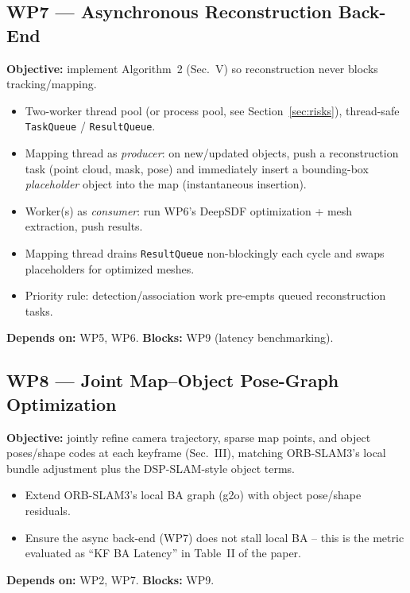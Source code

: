 \documentclass[11pt]{article}
\begin{document}
\subsection*{WP7 --- Asynchronous Reconstruction Back-End}
\textbf{Objective:} implement Algorithm~2 (Sec.~V) so reconstruction never blocks tracking/mapping.
\begin{itemize}[nosep]
  \item Two-worker thread pool (or process pool, see Section~\ref{sec:risks}), thread-safe \texttt{TaskQueue} / \texttt{ResultQueue}.
  \item Mapping thread as \emph{producer}: on new/updated objects, push a reconstruction task (point cloud, mask, pose) and immediately insert a bounding-box \emph{placeholder} object into the map (instantaneous insertion).
  \item Worker(s) as \emph{consumer}: run WP6's DeepSDF optimization + mesh extraction, push results.
  \item Mapping thread drains \texttt{ResultQueue} non-blockingly each cycle and swaps placeholders for optimized meshes.
  \item Priority rule: detection/association work pre-empts queued reconstruction tasks.
\end{itemize}
\textbf{Depends on:} WP5, WP6. \textbf{Blocks:} WP9 (latency benchmarking).

\subsection*{WP8 --- Joint Map--Object Pose-Graph Optimization}
\textbf{Objective:} jointly refine camera trajectory, sparse map points, and object poses/shape codes at each keyframe (Sec.~III), matching ORB-SLAM3's local bundle adjustment plus the DSP-SLAM-style object terms.
\begin{itemize}[nosep]
  \item Extend ORB-SLAM3's local BA graph (g2o) with object pose/shape residuals.
  \item Ensure the async back-end (WP7) does not stall local BA -- this is the metric evaluated as ``KF BA Latency'' in Table~II of the paper.
\end{itemize}
\textbf{Depends on:} WP2, WP7. \textbf{Blocks:} WP9.
\end{document}
